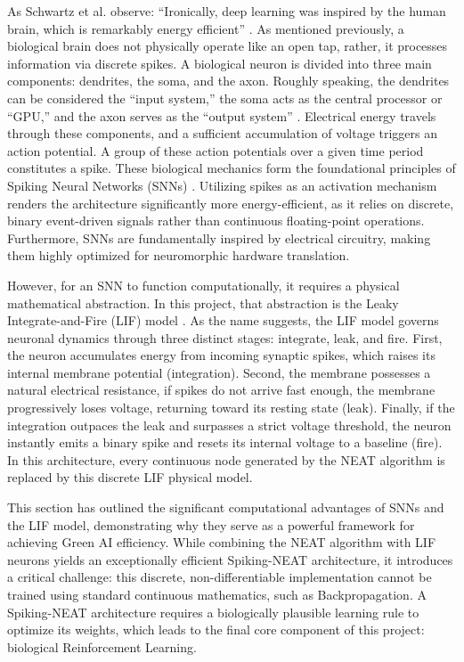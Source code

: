 As Schwartz et al. observe: ``Ironically, deep learning was inspired by the human brain, which is remarkably energy efficient'' \cite{schwartz2020green}. As mentioned previously, a biological brain does not physically operate like an open tap, rather, it processes information via discrete spikes. A biological neuron is divided into three main components: dendrites, the soma, and the axon. Roughly speaking, the dendrites can be considered the ``input system,'' the soma acts as the central processor or ``GPU,'' and the axon serves as the ``output system'' \cite{gerstner2014}. Electrical energy travels through these components, and a sufficient accumulation of voltage triggers an action potential. A group of these action potentials over a given time period constitutes a spike. These biological mechanics form the foundational principles of Spiking Neural Networks (SNNs) \cite{gerstner2014}. Utilizing spikes as an activation mechanism renders the architecture significantly more energy-efficient, as it relies on discrete, binary event-driven signals rather than continuous floating-point operations. Furthermore, SNNs are fundamentally inspired by electrical circuitry, making them highly optimized for neuromorphic hardware translation.

However, for an SNN to function computationally, it requires a physical mathematical abstraction. In this project, that abstraction is the Leaky Integrate-and-Fire (LIF) model \cite{gerstner2014}. As the name suggests, the LIF model governs neuronal dynamics through three distinct stages: integrate, leak, and fire. First, the neuron accumulates energy from incoming synaptic spikes, which raises its internal membrane potential (integration). Second, the membrane possesses a natural electrical resistance, if spikes do not arrive fast enough, the membrane progressively loses voltage, returning toward its resting state (leak). Finally, if the integration outpaces the leak and surpasses a strict voltage threshold, the neuron instantly emits a binary spike and resets its internal voltage to a baseline (fire). In this architecture, every continuous node generated by the NEAT algorithm is replaced by this discrete LIF physical model.

This section has outlined the significant computational advantages of SNNs and the LIF model, demonstrating why they serve as a powerful framework for achieving Green AI efficiency. While combining the NEAT algorithm with LIF neurons yields an exceptionally efficient Spiking-NEAT architecture, it introduces a critical challenge: this discrete, non-differentiable implementation cannot be trained using standard continuous mathematics, such as Backpropagation. A Spiking-NEAT architecture requires a biologically plausible learning rule to optimize its weights, which leads to the final core component of this project: biological Reinforcement Learning.



